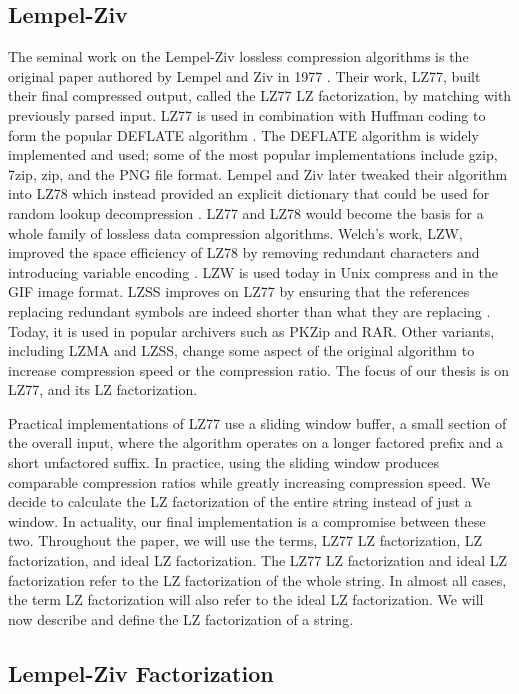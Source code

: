 \subsection{Lempel-Ziv}

The seminal work on the Lempel-Ziv lossless compression algorithms is the original paper authored by Lempel and Ziv in 1977 \cite{Ziv77auniversal}. 
Their work, LZ77, built their final compressed output, called the LZ77 LZ factorization, by matching with previously parsed input.
LZ77 is used in combination with Huffman coding to form the popular DEFLATE algorithm \cite{deutsch1996deflate}.
The DEFLATE algorithm is widely implemented and used; some of the most popular implementations include gzip, 7zip, zip, and the PNG file format.
Lempel and Ziv later tweaked their algorithm into LZ78 which instead provided an explicit dictionary that could be used for random lookup decompression \cite{ziv1978compression}.
LZ77 and LZ78 would become the basis for a whole family of lossless data compression algorithms.
Welch's work, LZW, improved the space efficiency of LZ78 by removing redundant characters and introducing variable encoding \cite{welch1984technique}.
LZW is used today in Unix compress and in the GIF image format.
LZSS improves on LZ77 by ensuring that the references replacing redundant symbols are indeed shorter than what they are replacing \cite{lzss}.
Today, it is used in popular archivers such as PKZip and RAR.
Other variants, including LZMA and LZSS, change some aspect of the original algorithm to increase compression speed or the compression ratio.
The focus of our thesis is on LZ77, and its LZ factorization.

Practical implementations of LZ77 use a sliding window buffer, a small section of the overall input, where the algorithm operates on a longer factored prefix and a short unfactored suffix.
In practice, using the sliding window produces comparable compression ratios while greatly increasing compression speed.
We decide to calculate the LZ factorization of the entire string instead of just a window.
In actuality, our final implementation is a compromise between these two.
Throughout the paper, we will use the terms, LZ77 LZ factorization, LZ factorization, and ideal LZ factorization.
The LZ77 LZ factorization and ideal LZ factorization refer to the LZ factorization of the whole string.
In almost all cases, the term LZ factorization will also refer to the ideal LZ factorization.
We will now describe and define the LZ factorization of a string.

\subsection{Lempel-Ziv Factorization}

